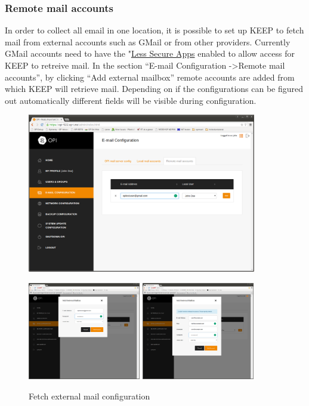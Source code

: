\documentclass[12pt,a4paper,titlepage]{article}
\begin{document}
\subsubsection{Remote mail accounts}
In order to collect all email in one location, it is possible to set up KEEP to fetch mail from external accounts such as GMail or from other providers. Currently GMail accounts need to have the "\href{https://support.google.com/accounts/answer/6010255?hl=en}{Less Secure Apps} enabled to allow access for KEEP to retreive mail.
In the section ``E-mail Configuration -\textgreater Remote mail accounts'', by clicking ``Add external mailbox'' remote accounts are added from which KEEP will retrieve mail.
Depending on if the configurations can be figured out automatically different fields will be visible during configuration.
\begin{figure}[h!]
\centering
\includegraphics[width=10cm]{./img/fetch-mail-1}

\includegraphics[width=4.93cm]{./img/fetch-mail-2}
\includegraphics[width=4.93cm]{./img/fetch-mail-3}
\caption{Fetch external mail configuration}
\end{figure}
\end{document}
